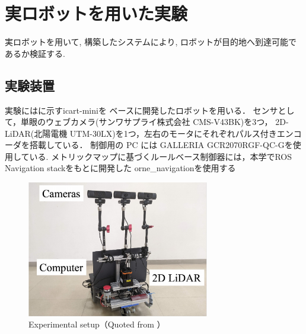 \section{実ロボットを用いた実験}
実ロボットを用いて, 構築したシステムにより, 
ロボットが目的地へ到達可能であるか検証する.

\subsection{実験装置}
実験にはに示すicart-mini\cite{icart}を
ベースに開発したロボットを用いる．
センサとして，単眼のウェブカメラ(サンワサプライ株式会社 CMS-V43BK)を3つ，
2D-LiDAR(北陽電機 UTM-30LX)を1つ，左右のモータにそれぞれパルス付きエンコーダを搭載している．
制御用の PC には GALLERIA GCR2070RGF-QC-Gを使用している.
メトリックマップに基づくルールベース制御器には，本学でROS Navigation stackをもとに開発した
orne\_navigation\cite{orne_nav}を使用する
\begin{figure}[htbp]
    \centering
     \includegraphics[width=80mm]{images/pdf/gamma_sensor.pdf}
     \caption[Experimental setup]{Experimental setup（Quoted from \cite{haruyama2023}）}\label{fig:gamma}
\end{figure}

\newpage
